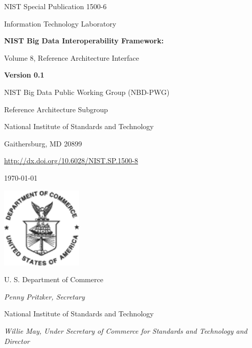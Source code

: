 \newpage

\begin{flushright}
NIST Special Publication 1500-6

Information Technology Laboratory

\bigskip 

{\Huge\bf\sf NIST Big Data Interoperability Framework:

\bigskip

Volume 8, Reference Architecture Interface
}

\bigskip

{\bf Version 0.1}

\bigskip \bigskip \bigskip \bigskip \bigskip \bigskip

NIST Big Data Public Working Group (NBD-PWG)

Reference Architecture Subgroup

National Institute of Standards and Technology

Gaithersburg, MD 20899

\bigskip

\url{http://dx.doi.org/10.6028/NIST.SP.1500-8}

\bigskip

\today

\vfill

\begin{flushright}
\includegraphics{images/dep-commerce.png}
\end{flushright}

 
U. S. Department of Commerce

{\it Penny Pritzker, Secretary}

\bigskip
National Institute of Standards and Technology

{\it Willie May, Under Secretary of Commerce for Standards and Technology and Director}
\end{flushright}


